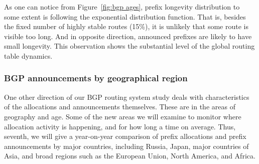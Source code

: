 As one can notice from Figure~\ref{fig:bgp ages}, prefix longevity
distribution to some extent is following the exponential distribution
function. That is, besides the fixed number of highly stable routes (15\%), it
is unlikely that some route is visible too long. And in opposite direction,
announced prefixes are likely to have small longevity. This observation shows
the substantial level of the global routing table dynamics.

\subsubsection{BGP announcements by geographical region}
One other direction of our BGP routing system study deals with characteristics
of the allocations and announcements themselves. These are in the areas of
geography and age. Some of the new areas we will examine to monitor where
allocation activity is happening, and for how long a time on average. Thus,
seventh, we will give a year-on-year comparison of prefix allocations and
prefix announcements by major countries, including Russia, Japan, major
countries of Asia, and broad regions such as the European Union, North
America, and Africa.



